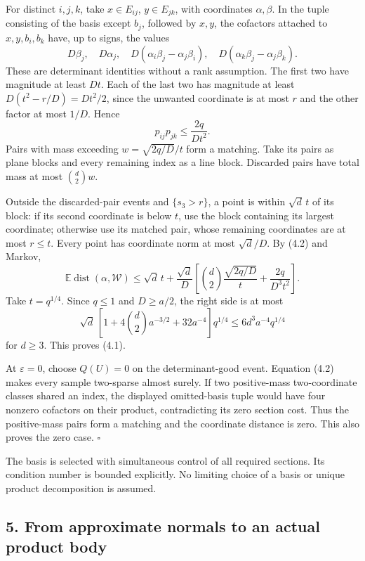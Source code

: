 \documentclass[
  11pt,
]{article}
\begin{document}
For distinct \(i,j,k\), take \(x\in E_{ij}\), \(y\in E_{jk}\), with
coordinates \(\alpha,\beta\). In the tuple consisting of the basis
except \(b_j\), followed by \(x,y\), the cofactors attached to
\(x,y,b_i,b_k\) have, up to signs, the values \[
 D\beta_j,\quad D\alpha_j,\quad
 D(\alpha_i\beta_j-\alpha_j\beta_i),\quad
 D(\alpha_k\beta_j-\alpha_j\beta_k).
\] These are determinant identities without a rank assumption. The first
two have magnitude at least \(Dt\). Each of the last two has magnitude
at least \(D(t^2-r/D)=Dt^2/2\), since the unwanted coordinate is at most
\(r\) and the other factor at most \(1/D\). Hence \[
 p_{ij}p_{jk}\le\frac{2q}{Dt^2}.
\] Pairs with mass exceeding \(w=\sqrt{2q/D}/t\) form a matching. Take
its pairs as plane blocks and every remaining index as a line block.
Discarded pairs have total mass at most \(\binom d2w\).

Outside the discarded-pair events and \(\{s_3>r\}\), a point is within
\(\sqrt d\,t\) of its block: if its second coordinate is below \(t\),
use the block containing its largest coordinate; otherwise use its
matched pair, whose remaining coordinates are at most \(r\le t\). Every
point has coordinate norm at most \(\sqrt d/D\). By (4.2) and Markov, \[
 \mathbb E\operatorname{dist}(\alpha,\mathcal W)
 \le\sqrt d\,t+\frac{\sqrt d}{D}
 \left[\binom d2\frac{\sqrt{2q/D}}t+\frac{2q}{D^3t^2}\right].     \tag{4.3}
\] Take \(t=q^{1/4}\). Since \(q\le1\) and \(D\ge a/2\), the right side
is at most \[
 \sqrt d\,[1+4\binom d2a^{-3/2}+32a^{-4}]q^{1/4}
 \le6d^3a^{-4}q^{1/4}
\] for \(d\ge3\). This proves (4.1).

At \(\varepsilon=0\), choose \(Q(U)=0\) on the determinant-good event.
Equation (4.2) makes every sample two-sparse almost surely. If two
positive-mass two-coordinate classes shared an index, the displayed
omitted-basis tuple would have four nonzero cofactors on their product,
contradicting its zero section cost. Thus the positive-mass pairs form a
matching and the coordinate distance is zero. This also proves the zero
case. \(\square\)

The basis is selected with simultaneous control of all required
sections. Its condition number is bounded explicitly. No limiting choice
of a basis or unique product decomposition is assumed.

\subsection{5. From approximate normals to an actual product
body}\label{from-approximate-normals-to-an-actual-product-body}
\end{document}
